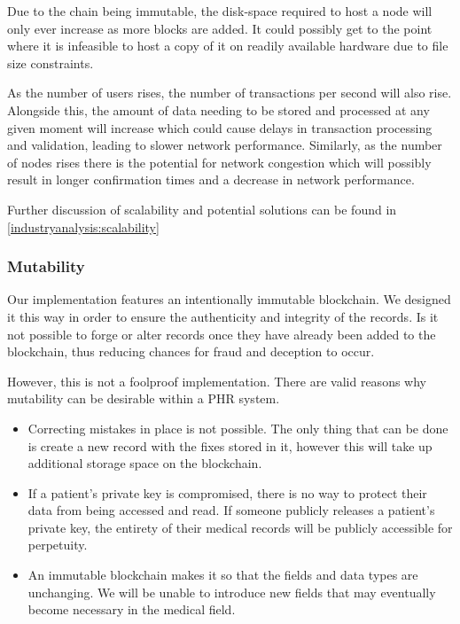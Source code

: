 \documentclass{article}
\begin{document}
Due to the chain being immutable, the disk-space required to host a node will only ever increase as more blocks are added. It could possibly get to the point where it is infeasible to host a copy of it on readily available hardware due to file size constraints.

As the number of users rises, the number of transactions per second will also rise. Alongside this, the amount of data needing to be stored and processed at any given moment will increase which could cause delays in transaction processing and validation, leading to slower network performance. Similarly, as the number of nodes rises there is the potential for network congestion which will possibly result in longer confirmation times and a decrease in network performance.

Further discussion of scalability and potential solutions can be found in \ref{industryanalysis:scalability}

\subsubsection{Mutability}
Our implementation features an intentionally immutable blockchain. We designed it this way in order to ensure the authenticity and integrity of the records. Is it not possible to forge or alter records once they have already been added to the blockchain, thus reducing chances for fraud and deception to occur.

However, this is not a foolproof implementation. There are valid reasons why mutability can be desirable within a PHR system.

\begin{itemize}
    \item Correcting mistakes in place is not possible. The only thing that can be done is create a new record with the fixes stored in it, however this will take up additional storage space on the blockchain.
    \item If a patient's private key is compromised, there is no way to protect their data from being accessed and read. If someone publicly releases a patient's private key, the entirety of their medical records will be publicly accessible for perpetuity.
    \item An immutable blockchain makes it so that the fields and data types are unchanging. We will be unable to introduce new fields that may eventually become necessary in the medical field.
\end{itemize}
\end{document}
